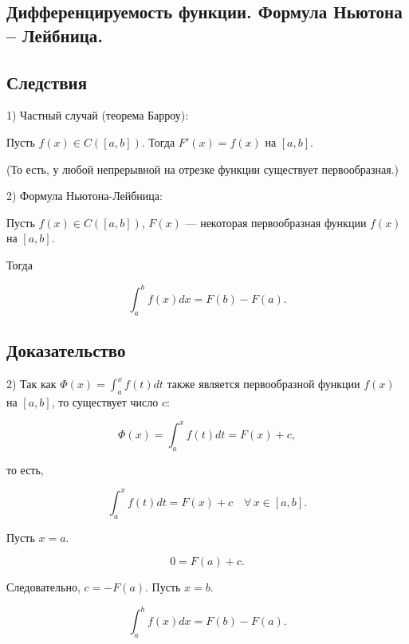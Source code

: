 {
\subsection{Дифференцируемость функции. Формула Ньютона – Лейбница.}
\subsection*{Следствия}

1) Частный случай (теорема Барроу):

Пусть \( f(x) \in C([a, b]) \). Тогда \( F'(x) = f(x) \) на \( [a, b] \).

(То есть, у любой непрерывной на отрезке функции существует первообразная.)

2) Формула Ньютона-Лейбница:

Пусть \( f(x) \in C([a, b]) \), \( F(x) \) — некоторая первообразная функции \( f(x) \) на \( [a, b] \).

Тогда

\[
\int_{a}^{b} f(x)dx = F(b) - F(a).
\]

\subsection*{Доказательство}

2) Так как \( \Phi(x) = \int_{a}^{x} f(t)dt \) также является первообразной функции \( f(x) \) на \( [a,b] \), то существует число \( c \): 


\[
\Phi(x) = \int_{a}^{x} f(t)dt = F(x) + c,
\]


то есть,



\[
\int_{a}^{x} f(t)dt = F(x) + c \quad \forall \, x \in [a,b].
\]



Пусть \( x = a \).


\[
0 = F(a) + c.
\]


Следовательно, \( c = -F(a) \). Пусть \( x = b \).



\[
\int_{a}^{b} f(x)dx = F(b) - F(a).
\]
}
